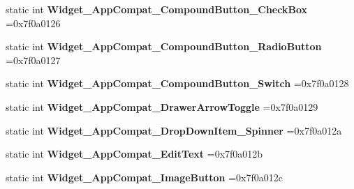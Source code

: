 \begin{DoxyCompactItemize}
\mbox{\label{classandroid_1_1support_1_1v7_1_1appcompat_1_1R_1_1style_af6207a92642a5c429f2876c9da1b8856}} 
static int {\bfseries Widget\+\_\+\+App\+Compat\+\_\+\+Compound\+Button\+\_\+\+Check\+Box} =0x7f0a0126
\item 
\mbox{\label{classandroid_1_1support_1_1v7_1_1appcompat_1_1R_1_1style_a1c5fd85362b6864b61c71467c93dbc11}} 
static int {\bfseries Widget\+\_\+\+App\+Compat\+\_\+\+Compound\+Button\+\_\+\+Radio\+Button} =0x7f0a0127
\item 
\mbox{\label{classandroid_1_1support_1_1v7_1_1appcompat_1_1R_1_1style_ab8d9dea0dd63fbb68720f1491e9749a1}} 
static int {\bfseries Widget\+\_\+\+App\+Compat\+\_\+\+Compound\+Button\+\_\+\+Switch} =0x7f0a0128
\item 
\mbox{\label{classandroid_1_1support_1_1v7_1_1appcompat_1_1R_1_1style_a96afd5128e1b1fe52698dfb4d053b8c1}} 
static int {\bfseries Widget\+\_\+\+App\+Compat\+\_\+\+Drawer\+Arrow\+Toggle} =0x7f0a0129
\item 
\mbox{\label{classandroid_1_1support_1_1v7_1_1appcompat_1_1R_1_1style_ab0303bbe93585656d817a558857cd3db}} 
static int {\bfseries Widget\+\_\+\+App\+Compat\+\_\+\+Drop\+Down\+Item\+\_\+\+Spinner} =0x7f0a012a
\item 
\mbox{\label{classandroid_1_1support_1_1v7_1_1appcompat_1_1R_1_1style_a879d52e3f9f49541c14863f1ac9831df}} 
static int {\bfseries Widget\+\_\+\+App\+Compat\+\_\+\+Edit\+Text} =0x7f0a012b
\item 
\mbox{\label{classandroid_1_1support_1_1v7_1_1appcompat_1_1R_1_1style_a3035fefc92a5535b222654c54c601a7c}} 
static int {\bfseries Widget\+\_\+\+App\+Compat\+\_\+\+Image\+Button} =0x7f0a012c
\item 
\mbox{\label{classandroid_1_1support_1_1v7_1_1appcompat_1_1R_1_1style_a5f598cba2ae1fc437103de39228b0795}} 

\end{DoxyCompactItemize}
